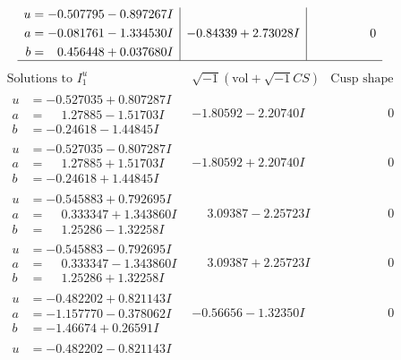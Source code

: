 \documentclass[1p]{elsarticle_modified}
\theoremstyle{definition}
\newcommand{\I}{\sqrt{-1}}
\begin{document}
$$\begin{array}{c|c|c}
\begin{aligned}
u &= -0.507795 - 0.897267 I \\
a &= -0.081761 - 1.334530 I \\
b &= \phantom{-}0.456448 + 0.037680 I\end{aligned}
 & -0.84339 + 2.73028 I & \phantom{-0.000000 } 0\\
 \hline 
 \end{array}$$\newpage$$\begin{array}{c|c|c}  
\text{Solutions to }I^u_{1}& \I (\text{vol} + \sqrt{-1}CS) & \text{Cusp shape}\\
 \hline 
\begin{aligned}
u &= -0.527035 + 0.807287 I \\
a &= \phantom{-}1.27885 - 1.51703 I \\
b &= -0.24618 - 1.44845 I\end{aligned}
 & -1.80592 - 2.20740 I & \phantom{-0.000000 } 0 \\ \hline\begin{aligned}
u &= -0.527035 - 0.807287 I \\
a &= \phantom{-}1.27885 + 1.51703 I \\
b &= -0.24618 + 1.44845 I\end{aligned}
 & -1.80592 + 2.20740 I & \phantom{-0.000000 } 0 \\ \hline\begin{aligned}
u &= -0.545883 + 0.792695 I \\
a &= \phantom{-}0.333347 + 1.343860 I \\
b &= \phantom{-}1.25286 - 1.32258 I\end{aligned}
 & \phantom{-}3.09387 - 2.25723 I & \phantom{-0.000000 } 0 \\ \hline\begin{aligned}
u &= -0.545883 - 0.792695 I \\
a &= \phantom{-}0.333347 - 1.343860 I \\
b &= \phantom{-}1.25286 + 1.32258 I\end{aligned}
 & \phantom{-}3.09387 + 2.25723 I & \phantom{-0.000000 } 0 \\ \hline\begin{aligned}
u &= -0.482202 + 0.821143 I \\
a &= -1.157770 - 0.378062 I \\
b &= -1.46674 + 0.26591 I\end{aligned}
 & -0.56656 - 1.32350 I & \phantom{-0.000000 } 0 \\ \hline\begin{aligned}
u &= -0.482202 - 0.821143 I \\

\end{aligned}
\end{array}$$
\end{document}
